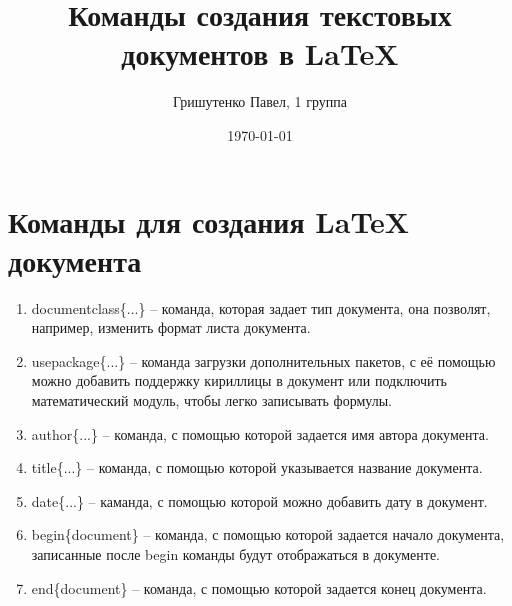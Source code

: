 \documentclass[a4paper,12pt]{article} %
\author{Гришутенко Павел, 1 группа}
\title{Команды создания текстовых документов в \LaTeX{}}
\date{\today}
\begin{document}

\section{Команды для создания LaTeX документа}
\begin{enumerate}
    \item documentclass\{...\} -- команда, которая задает тип документа, она позволят, например, изменить формат листа документа.
    \item usepackage\{...\} -- команда загрузки дополнительных пакетов, с её помощью можно добавить поддержку кириллицы в документ или подключить математический модуль, чтобы легко записывать формулы. 
    \item author\{...\} -- команда, с помощью которой задается имя автора документа.
    \item title\{...\} -- команда, с помощью которой указывается название документа.
    \item date\{...\} -- каманда, с помощью которой можно добавить дату в документ.
    \item begin\{document\} -- команда, с помощью которой задается начало документа, записанные после begin команды будут отображаться в документе.
    \item end\{document\} -- команда, с помощью которой задается конец документа.
\end{enumerate}
\end{document}
